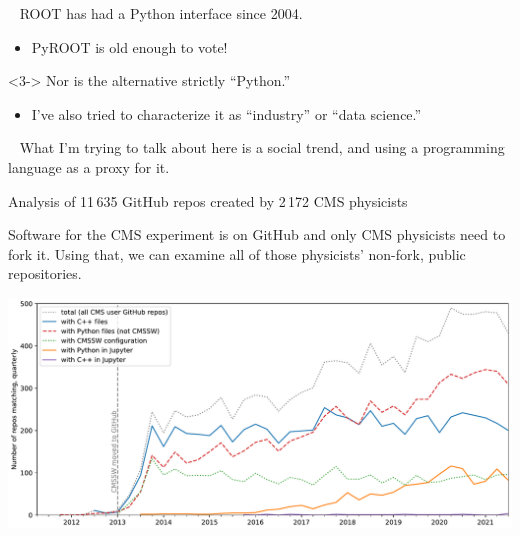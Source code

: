 \documentclass[aspectratio=169]{beamer}
\begin{document}
\begin{frame}{\mbox{ }}
\Large
\vspace{0.25 cm}
ROOT has had a Python interface since 2004.

\vspace{0.2 cm}
\begin{itemize}
\item<2-> PyROOT is old enough to vote!
\end{itemize}

\vspace{1.25 cm}
\begin{uncoverenv}<3->
Nor is the alternative strictly ``Python.''
\vspace{0.2 cm}
\begin{itemize}
\item<4-> I've also tried to characterize it as ``industry'' or ``data science.''
\end{itemize}
\end{uncoverenv}
\end{frame}

\begin{frame}{\mbox{ }}
\Large
What I'm trying to talk about here is a social trend, and using a programming language as a proxy for it.
\end{frame}

\begin{frame}{Analysis of 11\,635 GitHub repos created by 2\,172 CMS physicists}
\vspace{0.25 cm}

Software for the CMS experiment is on GitHub and only CMS physicists need to fork it. Using that, we can examine all of those physicists' non-fork, public repositories.

\vspace{0.2 cm}

\includegraphics[width=\linewidth]{PLOTS/gihub-language-fullstudy.pdf}
\end{frame}
\end{document}

